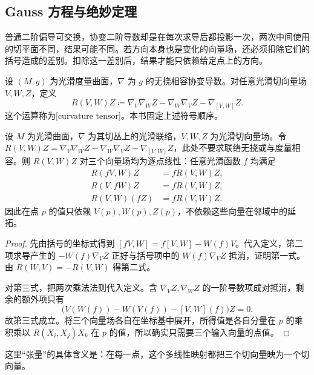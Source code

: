 \subsection{Gauss 方程与绝妙定理}
\label{g1:subsec:0803:03}

普通二阶偏导可交换，协变二阶导数却是在每次求导后都投影一次，两次中间使用的切平面不同，结果可能不同。若方向本身也是变化的向量场，还必须扣除它们的括号造成的差别。扣除这一差别后，结果才能只依赖给定点上的方向。

\begin{definition}
	\label{g1:def:surface-curvature-tensor}
	设 \((M,g)\) 为光滑度量曲面，\(\nabla\) 为 \(g\) 的无挠相容协变导数。对任意光滑切向量场 \(V,W,Z\)，定义
	\[
		R(V,W)Z\coloneqq\nabla_V\nabla_WZ-\nabla_W\nabla_VZ-\nabla_{[V,W]}Z.
	\]
	这个运算称为[curvature tensor]。本书固定上述符号顺序。
\end{definition}

\begin{proposition}
	\label{g1:prop:curvature-tensorial}
	设 \(M\) 为光滑曲面，\(\nabla\) 为其切丛上的光滑联络，\(V,W,Z\) 为光滑切向量场。令 \(R(V,W)Z=\nabla_V\nabla_WZ-\nabla_W\nabla_VZ-\nabla_{[V,W]}Z\)，此处不要求联络无挠或与度量相容。则 \(R(V,W)Z\) 对三个向量场均为逐点线性：任意光滑函数 \(f\) 均满足
	\begin{align*}
		R(fV,W)Z&=fR(V,W)Z,\\
		R(V,fW)Z&=fR(V,W)Z,\\
		R(V,W)(fZ)&=fR(V,W)Z.
	\end{align*}
	因此在点 \(p\) 的值只依赖 \(V(p),W(p),Z(p)\)，不依赖这些向量在邻域中的延拓。
\end{proposition}

\begin{proof}
	先由括号的坐标式得到 \([fV,W]=f[V,W]-W(f)V\)。代入定义，第二项求导产生的 \(-W(f)\nabla_VZ\) 正好与括号项中的 \(W(f)\nabla_VZ\) 抵消，证明第一式。由 \(R(W,V)=-R(V,W)\) 得第二式。

	对第三式，把两次乘法法则代入定义。含 \(\nabla_VZ,\nabla_WZ\) 的一阶导数项成对抵消，剩余的额外项只有
	\[
		\bigl(V(W(f))-W(V(f))-[V,W](f)\bigr)Z=0.
	\]
	故第三式成立。将三个向量场各自在坐标基中展开，所得值是各自分量在 \(p\) 的乘积乘以 \(R(X_i,X_j)X_k\) 在 \(p\) 的值，所以确实只需要三个输入向量的点值。
\end{proof}

这里“张量”的具体含义是：在每一点，这个多线性映射都把三个切向量映为一个切向量。

\ProseParagraphBreak

